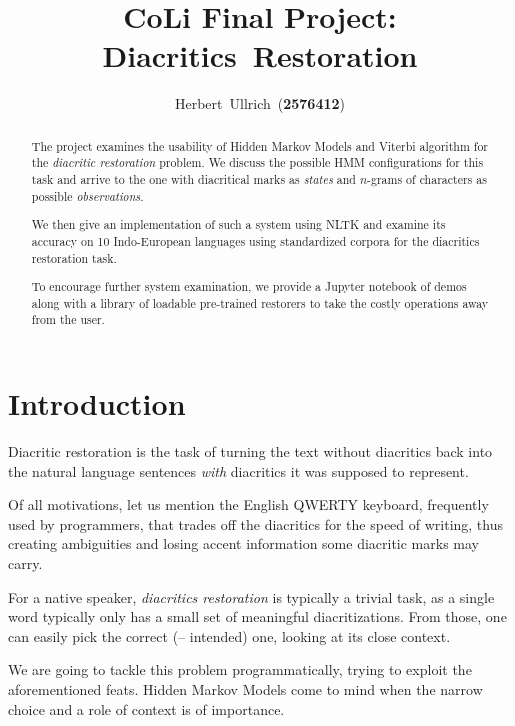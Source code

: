 \documentclass[12pt]{article}
\begin{document}
    \title{CoLi Final Project: Diacritics~Restoration}
    \author{Herbert~Ullrich~(\textbf{2576412})}
    \begin{titlingpage}
        \maketitle
        \begin{abstract}
            The project examines the usability of Hidden Markov Models and Viterbi algorithm for the \textit{diacritic restoration} problem.
            We discuss the possible HMM configurations for this task and arrive to the one with diacritical marks as \textit{states}
            and $n$-grams of characters as possible \textit{observations}.

            We then give an implementation of such a system using \textsf{NLTK}
            and examine its accuracy on 10 Indo-European languages using standardized
            corpora for the diacritics restoration task.

            To encourage further system examination, we provide a \textsf{Jupyter} notebook of demos along with
            a library of loadable pre-trained restorers to take the costly operations away from the user.
        \end{abstract}
    \end{titlingpage}


    \section{Introduction}
    Diacritic restoration is the task of turning the text without diacritics back into the natural language sentences
    \textit{with} diacritics it was supposed to represent.

    Of all motivations, let us mention the English QWERTY keyboard, frequently used by programmers, that
    trades off the diacritics for the speed of writing, thus creating ambiguities and losing accent information
    some diacritic marks may carry.

    For a native speaker, \textit{diacritics restoration} is typically a trivial task, as
    a single word typically only has a small set of meaningful diacritizations.
    From those, one can easily pick the correct (-- intended) one, looking at its close context.

    We are going to tackle this problem programmatically, trying to exploit the aforementioned feats.
    Hidden Markov Models come to mind when the narrow choice and a role of context is of importance.
\end{document}
